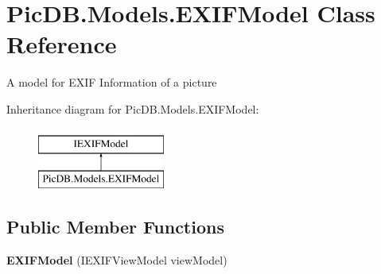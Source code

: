 \hypertarget{class_pic_d_b_1_1_models_1_1_e_x_i_f_model}{}\section{Pic\+D\+B.\+Models.\+E\+X\+I\+F\+Model Class Reference}
\label{class_pic_d_b_1_1_models_1_1_e_x_i_f_model}


A model for E\+X\+IF Information of a picture  


Inheritance diagram for Pic\+D\+B.\+Models.\+E\+X\+I\+F\+Model\+:\begin{figure}[H]
\begin{center}
\leavevmode
\includegraphics[height=2.000000cm]{class_pic_d_b_1_1_models_1_1_e_x_i_f_model}
\end{center}
\end{figure}
\subsection*{Public Member Functions}
\begin{DoxyCompactItemize}
\item 
\mbox{\label{class_pic_d_b_1_1_models_1_1_e_x_i_f_model_afaf5498f69b3a0550898dd166206c62b}} 
{\bfseries E\+X\+I\+F\+Model} (I\+E\+X\+I\+F\+View\+Model view\+Model)
\end{DoxyCompactItemize}
